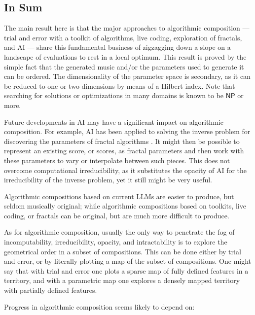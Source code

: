 \documentclass[11pt,papersize=a4]{scrartcl}
\begin{document}
\subsection*{In Sum}

The main result here is that the major approaches to algorithmic composition --- trial and error with a toolkit of algorithms, live coding, exploration of fractals, and AI --- share this fundamental business of zigzagging down a slope on a landscape of evaluations to rest in a local optimum. This result is proved by the simple fact that the generated music and/or the parameters used to generate it can be ordered. The dimensionality of the parameter space is secondary, as it can be reduced to one or two dimensions by means of a Hilbert index. Note that searching for solutions or optimizations in many domains is known to be $\mathsf{NP}$ or more.

Future developments in AI may have a significant impact on algorithmic composition. For example, AI has been applied to solving the inverse problem for discovering the parameters of fractal algorithms \parencite{tu2023learning}. It might then be possible to represent an existing score, or scores, as fractal parameters and then work with these parameters to vary or interpolate between such pieces. This does not overcome computational irreducibility, as it substitutes the opacity of AI for the irreducibility of the inverse problem, yet it still might be very useful.

 Algorithmic compositions based on current LLMs are easier to produce, but seldom musically original; while algorithmic compositions based on toolkits, live coding, or fractals can be original, but are much more difficult to produce.

As for algorithmic composition, usually the only way to penetrate the fog of incomputability, irreducibility, opacity, and intractability is to explore the geometrical order in a subset of compositions. This can be done either by trial and error, or by literally plotting a map of the subset of compositions. One might say that with trial and error one plots a sparse map of fully defined features in a territory, and with a parametric map one explores a densely mapped territory with partially defined features.

Progress in algorithmic composition seems likely to depend on:
\end{document}
